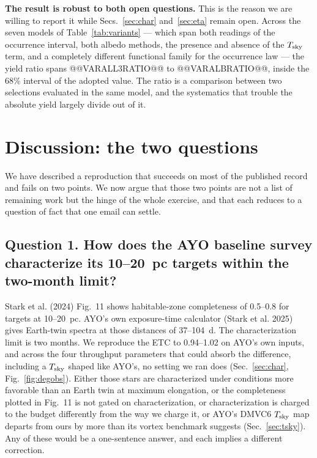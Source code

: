 \documentclass[11pt,a4paper]{article}
\begin{document}
\textbf{The result is robust to both open questions.} This is the reason we are willing to report
it while Secs.~\ref{sec:char} and~\ref{sec:eta} remain open. Across the seven models of
Table~\ref{tab:variants} --- which span both readings of the occurrence interval, both albedo
methods, the presence and absence of the $T_{\rm sky}$ term, and a completely different functional
family for the occurrence law --- the yield ratio spans @@VARALL3RATIO@@ to @@VARALBRATIO@@, inside
the 68\% interval of the adopted value. The ratio
is a comparison between two selections evaluated in the same model, and the systematics that
trouble the absolute yield largely divide out of it.

\section{Discussion: the two questions}
\label{sec:discussion}

We have described a reproduction that succeeds on most of the published record and fails on two
points. We now argue that those two points are not a list of remaining work but the hinge of the
whole exercise, and that each reduces to a question of fact that one email can settle.

\subsection*{Question 1. How does the AYO baseline survey characterize its 10--20~pc targets
within the two-month limit?}

Stark et al. (2024) Fig.~11 shows habitable-zone completeness of 0.5--0.8 for targets at 10--20~pc.
AYO's own exposure-time calculator (Stark et al. 2025) gives Earth-twin spectra at those distances
of 37--104~d. The characterization limit is two months. We reproduce the ETC to 0.94--1.02 on
AYO's own inputs, and across the four throughput parameters that could absorb the difference,
including a $T_{\rm sky}$ shaped like AYO's, no setting we ran does (Sec.~\ref{sec:char},
Fig.~\ref{fig:degobs}). Either those stars are characterized under conditions more favorable than
an Earth twin at maximum elongation, or the completeness plotted in Fig.~11 is not gated on
characterization, or characterization is charged to the budget differently from the way we charge
it, or AYO's DMVC6 $T_{\rm sky}$ map departs from ours by more than its vortex benchmark suggests
(Sec.~\ref{sec:tsky}). Any of these would be a one-sentence answer, and each implies a different
correction.
\end{document}
